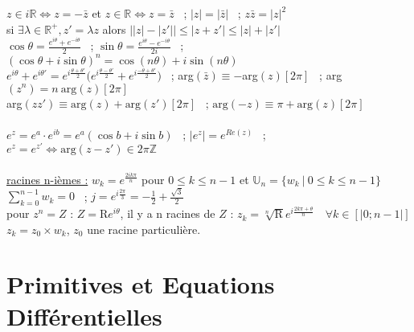\documentclass[12 pt]{book}
\begin{document}
\begin{flushleft}
\begin{doublespace}

	$z\in i\mathbb{R} \Leftrightarrow z=-\bar{z}$ et $z\in \mathbb{R} \Leftrightarrow z=\bar{z}$ \ ; $|z|=|\bar{z}|$ \ ; $z\bar{z}=|z|^2$ \\
	si $\exists \lambda \in \mathbb{R}^{+}, z'=\lambda z$ alors $\Big| |z| - |z'| \Big| \leq |z+z'| \leq |z| + |z'|$ \\
	$\cos \theta = \frac{e^{i \theta} + e^{-i \theta}}{2}$ \ ; $\sin \theta = \frac{e^{i \theta} - e^{-i \theta}}{2 i}$ \ ; $(\cos \theta + i \sin \theta)^n = \cos(n \theta)+i\sin(n \theta)$ \\
	$e^{i\theta} + e^{i\theta'} = e^{i\frac{\theta +\theta'}{2}} \Big( e^{i \frac{\theta - \theta'}{2}} + e^{i \frac{-\theta + \theta'}{2}} \Big)$ \ ;  arg$(\bar{z})\equiv- $arg$(z) [2\pi]$ \ ; arg$(z^n) = n \ \text{arg}(z) [2 \pi]$\\
	arg$(zz') \equiv \text{arg}(z) + \text{arg}(z') [2\pi]$ \ ; $\text{arg}(-z) \equiv \pi + \text{arg}(z) [2\pi]$\\
	\text{ } \\
	$e^z = e^a \cdot e^{ib} = e^a(\cos b + i \sin b)$ \ ; $|e^z|=e^{Re(z)} $ \ ; $ e^z=e^{z'} \Leftrightarrow \text{arg}(z-z') \in 2\pi \mathbb{Z} $ \\
	\text{ } \\
	\underline{racines n-ièmes :} $w_k =e^{\frac{2i k\pi}{n}}$ pour $0\leq k \leq n-1$ et $\mathbb{U}_n = \{w_k \ | \ 0 \leq k \leq n-1\} $ \\
	$\sum\limits_{k=0}^{n-1} w_k = 0$ \ ; $ j=e^{i \frac{2 \pi}{3}} = - \frac{1}{2} + \frac{\sqrt{3}}{2}$ \\
	pour $z^n=Z$ : $Z=\text{R} e^{i\theta}$, il y a n racines de $Z$ : $z_k= \sqrt[n]{\text{R}} e^{i\frac{2k\pi + \theta}{n}} \quad \forall k \in [| 0;n-1|]$ \\
	$z_k = z_0 \times w_k$, $z_0$ une racine particulière.\\
\end{doublespace}
\end{flushleft}

\newpage
\section*{Primitives et Equations Différentielles}
\end{document}
